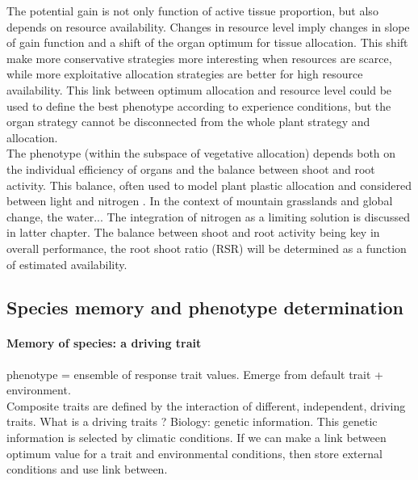 The potential gain is not only function of active tissue proportion, but also depends on resource availability. Changes in resource level imply changes in slope of gain function and a shift of the organ optimum for tissue allocation. This shift make more conservative strategies more interesting when resources are scarce, while more exploitative allocation strategies are better for high resource availability. This link between optimum allocation and resource level could be used to define the best phenotype according to experience conditions, but the organ strategy cannot be disconnected from the whole plant strategy and allocation.\\

The phenotype (within the subspace of vegetative allocation) depends both on the individual efficiency of organs and the balance between shoot and root activity. This balance, often used to model plant plastic allocation and considered between light and nitrogen \cite{lohier, soussana}. In the context of mountain grasslands and global change, the water... The integration of nitrogen as a limiting solution is discussed in latter chapter. The balance between shoot and root activity being key in overall performance, the root shoot ratio (RSR) will be determined as a function of estimated availability.


\subsection{Species memory and phenotype determination}\label{subsection:memory}

\paragraph{Memory of species: a driving trait}

phenotype = ensemble of response trait values. Emerge from default trait + environment.\\
Composite traits are defined by the interaction of different, independent, driving traits. What is a driving traits ? Biology: genetic information. This genetic information is selected by climatic conditions. If we can make a link between optimum value for a trait and environmental conditions, then store external conditions and use link between.\\




